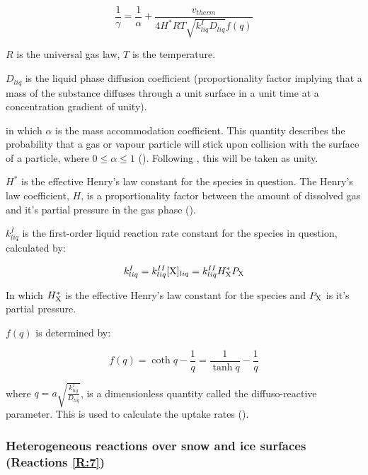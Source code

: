 \begin{equation}
    \frac{1}{\gamma} = \frac{1}{\alpha}+ \frac{v_{therm}}{4H^*RT\sqrt{k_{liq}^ID_{liq}}f(q)}
    \label{eq:upt_coeff}
\end{equation}

\medskip

$R$ is the universal gas law, $T$ is the temperature.

\medskip

$D_{liq}$ is the liquid phase diffusion coefficient (proportionality factor implying that a mass of the substance diffuses through a unit surface in a unit time at a concentration gradient of unity). 

\medskip

in which $\alpha$ is the mass accommodation coefficient. This quantity describes the probability that a gas or vapour particle will stick upon collision with the surface of a particle, where $0\leq\alpha\leq1$ (\cite{SeinfeldSpyros}). Following \cite{CAO}, this will be taken as unity. 

\medskip

$H^*$ is the effective Henry's law constant for the species in question. The Henry's law coefficient, $H$, is a proportionality factor between the amount of dissolved gas and it's partial pressure in the gas phase (\cite{Sander2015}).  

$k_{liq}^I$ is the first-order liquid reaction rate constant for the species in question, calculated by: 

\begin{equation}
    k_{liq}^I = k_{liq}^{II}[\mathrm{X}]_{liq}= k_{liq}^{II}H^*_{\mathrm{X}}P_{\mathrm{X}}
\end{equation}

In which $H^*_{\mathrm{X}}$ is the effective Henry's law constant for the species and $P_{\mathrm{X}}$ is it's partial pressure.

\medskip

$f(q)$ is determined by: 

\begin{equation}
    f(q) = \coth{q} -\frac{1}{q} = \frac{1}{\tanh{q}} -\frac{1}{q}
\end{equation}

where $q = a\sqrt{\frac{k_{liq}^I}{D_{liq}}}$, is a dimensionless quantity called the diffuso-reactive parameter. This is used to calculate the uptake rates (\cite{Hanson1994}). 


\subsubsection{Heterogeneous reactions over snow and ice surfaces (Reactions \ref{R:7})}\label{sec:snow_ice_react}


